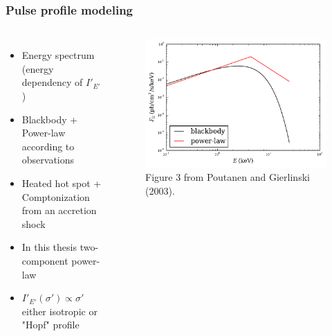 \documentclass{beamer}
\begin{document}




\begin{frame}
\frametitle{Pulse profile modeling}
\begin{columns}[t] %
\begin{itemize}

\item Energy spectrum (energy dependency of $I'_{E'}$)
\item Blackbody + Power-law according to observations
\item Heated hot spot + Comptonization from an accretion shock
\item In this thesis two-component power-law 
\item $I'_{E'}(\sigma') \propto \sigma'$ either isotropic or "Hopf" profile

\end{itemize}
\begin{figure}
\includegraphics[width=1.1\linewidth]{spectrum_numflux0.pdf}
\caption{Figure 3 from Poutanen and Gierlinski (2003).}
\end{figure}
\end{columns}
\end{frame}

\end{document}
